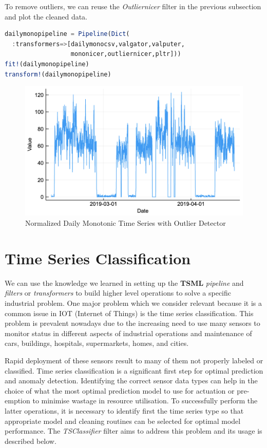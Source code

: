 \documentclass{juliacon}
\begin{document}
To remove outliers, we can reuse the \emph{Outliernicer} filter in the previous subsection and plot the cleaned data.

\begin{lstlisting}[language = Julia]
dailymonopipeline = Pipeline(Dict(
  :transformers=>[dailymonocsv,valgator,valputer,
                  mononicer,outliernicer,pltr]))
fit!(dailymonopipeline)
transform!(dailymonopipeline)
\end{lstlisting}

\begin{figure}[htbp]
   \centering
   \includegraphics[width=\columnwidth]{outnormdailymono.png}  %
   \caption{Normalized Daily Monotonic Time Series with Outlier Detector}
   \label{fig:outndailymono}
\end{figure}


\section{Time Series Classification}

We can use the knowledge we learned in setting up the \textbf{TSML}
\emph{pipeline} and \emph{filters} or \emph{transformers} to build higher level
operations to solve a specific industrial problem. One major problem
which we consider relevant because it is a common issue in IOT (Internet of Things) 
 is the time series classification. This problem is prevalent nowadays 
due to the increasing need to use many sensors to monitor status in different aspects of industrial
operations and maintenance of cars, buildings, hospitals, supermarkets, homes, and cities.

\vskip 6pt

Rapid deployment of these sensors result to many of them not properly labeled or classified.
Time series classification is a significant first step for optimal prediction and anomaly detection.
Identifying the correct sensor data types can help in the choice of what the most optimal prediction 
model to use for actuation or pre-emption to minimise wastage in resource utilisation.
To successfully perform the latter operations, it is necessary to identify first the time series
type so that appropriate model and cleaning routines can be selected for optimal model performance. The  \emph{TSClassifier} filter aims to address this problem and its usage is described below.
\end{document}
